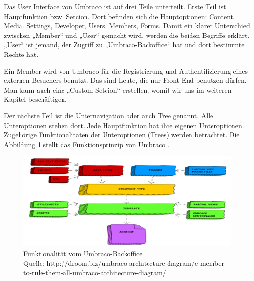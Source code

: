 Das User Interface von Umbraco ist auf drei Teile unterteilt. Erste Teil ist Hauptfunktion bzw. Setcion. Dort befinden sich die Hauptoptionen: Content, Media. Settings, Developer, Users, Members, Forms.
Damit ein klarer Unterschied zwischen „Member“ und „User“ gemacht wird, werden die beiden Begriffe erklärt. „User“ ist jemand, der Zugriff zu „Umbraco-Backoffice“ hat und dort bestimmte Rechte hat. 

Ein Member wird von Umbraco für die Registrierung und Authentifizierung eines externen Besuchers benutzt. Das sind Leute, die nur Front-End benutzen dürfen. 
Man kann auch eine „Custom Setcion“ erstellen, womit wir uns im weiteren Kapitel beschäftigen. 

Der nächste Teil ist die Unternavigation oder auch Tree genannt. Alle Unteroptionen stehen dort. Jede Hauptfunktion hat ihre eigenen Unteroptionen.
Zugehörige Funktionalitäten der Unteroptionen (Trees) werden betrachtet. Die Abbildung \ref{fig:UmbracoFunktionalitaet} stellt das Funktionsprinzip von Umbraco \cite{UmbracoHQ2018Backofficeoverview}.

\begin{figure}[h]
	\centering
	\includegraphics[width=1\linewidth]{Graphics/umbracoAufbau.png}
	\caption[Umbraco Backoffice]{Funktionalität vom Umbraco-Backoffice\\Quelle: http://droom.biz/umbraco-architecture-diagram/e-member-to-rule-them-all-umbraco-architecture-diagram/
	}
	\label{fig:UmbracoFunktionalitaet}
\end{figure} 

